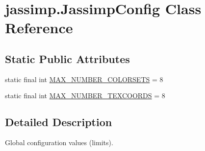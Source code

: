 \hypertarget{classjassimp_1_1_jassimp_config}{\section{jassimp.\+Jassimp\+Config Class Reference}
\label{classjassimp_1_1_jassimp_config}
}
\subsection*{Static Public Attributes}
\begin{DoxyCompactItemize}
\item 
static final int \hyperlink{classjassimp_1_1_jassimp_config_a11cb1067092bc9aae06a2414950af219}{M\+A\+X\+\_\+\+N\+U\+M\+B\+E\+R\+\_\+\+C\+O\+L\+O\+R\+S\+E\+T\+S} = 8
\item 
static final int \hyperlink{classjassimp_1_1_jassimp_config_af64bc93826354230113abdcbe1af475f}{M\+A\+X\+\_\+\+N\+U\+M\+B\+E\+R\+\_\+\+T\+E\+X\+C\+O\+O\+R\+D\+S} = 8
\end{DoxyCompactItemize}


\subsection{Detailed Description}
Global configuration values (limits). 

